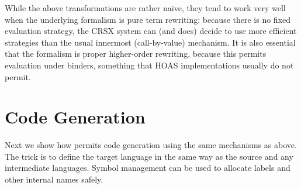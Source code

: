 \documentclass[letterpaper]{llncs}
\begin{document}
While the above transformations are rather naïve, they tend to work very well when the underlying
formalism is pure term rewriting: because there is no fixed evaluation strategy, the CRSX system can
(and does) decide to use more efficient strategies than the usual innermost (call-by-value)
mechanism. It is also essential that the formalism is proper higher-order rewriting, because this
permits evaluation under binders, something that HOAS implementations usually do not permit.


\section{Code Generation}
\label{sec:cogen}

Next we show how \HAX permits code generation using the same mechanisms as above. The trick is to
define the target language in the same way as the source and any intermediate languages. Symbol
management can be used to allocate labels and other internal names safely.
\end{document}
